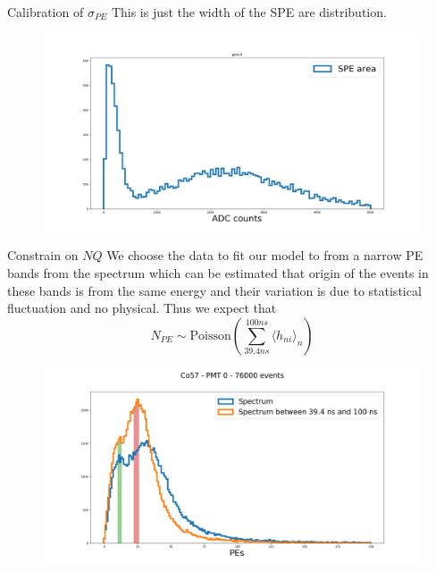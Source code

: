 \documentclass{beamer}
\begin{document}
\begin{frame}{Calibration of $\sigma_{PE}$}
This is just the width of the SPE are distribution.
\begin{figure}[h]
\includegraphics[width=1\linewidth]{area.png}
\end{figure}
\end{frame}

\begin{frame}{Constrain on $NQ$}
We choose the data to fit our model to from a narrow PE bands from the spectrum which can be estimated that origin of the events in these bands is from the same energy and their variation is due to statistical fluctuation and no physical. Thus we expect that
\begin{equation}
N_{PE}\sim\text{Poisson}(\sum_{39.4 ns}^{100 ns}\langle h_{ni}\rangle_n)
\end{equation}  
\begin{figure}[h]
\includegraphics[width=0.75\linewidth]{spec_peak.png}
\end{figure}
\end{frame}
\end{document}
